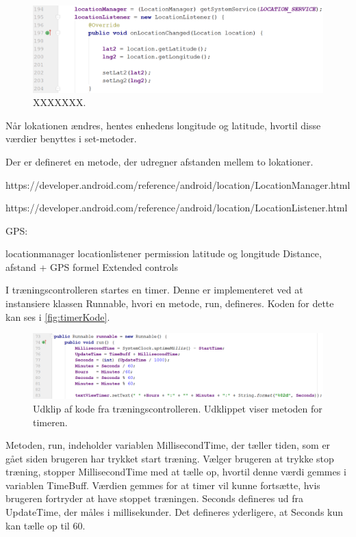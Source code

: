 \begin{figure} [H]
\centering
\includegraphics[width=1\textwidth]{figures/imple/gpsKode}
\caption{XXXXXXX.}
\label{fig:gpsKode}
\end{figure} 

Når lokationen ændres, hentes enhedens longitude og latitude, hvortil disse værdier benyttes i set-metoder. 

Der er defineret en metode, der udregner afstanden mellem to lokationer.



https://developer.android.com/reference/android/location/LocationManager.html 

https://developer.android.com/reference/android/location/LocationListener.html

 


GPS:

locationmanager
locationlistener
permission
latitude og longitude
Distance, afstand  + GPS formel
Extended controls


I træningscontrolleren startes en timer. Denne er implementeret ved at instansiere klassen Runnable, hvori en metode, run, defineres. Koden for dette kan ses i \autoref{fig:timerKode}.

\begin{figure} [H]
\centering
\includegraphics[width=1\textwidth]{figures/imple/timerKode}
\caption{Udklip af kode fra træningscontrolleren. Udklippet viser metoden for timeren.}
\label{fig:timerKode}
\end{figure} 

\noindent
Metoden, run, indeholder variablen MillisecondTime, der tæller tiden, som er gået siden brugeren har trykket start træning. Vælger brugeren at trykke stop træning, stopper MillisecondTime med at tælle op, hvortil denne værdi gemmes i variablen TimeBuff.  Værdien gemmes for at timer vil kunne fortsætte, hvis brugeren fortryder at have stoppet træningen. Seconds defineres ud fra UpdateTime, der måles i millisekunder. Det defineres yderligere, at Seconds kun kan tælle op til 60.

